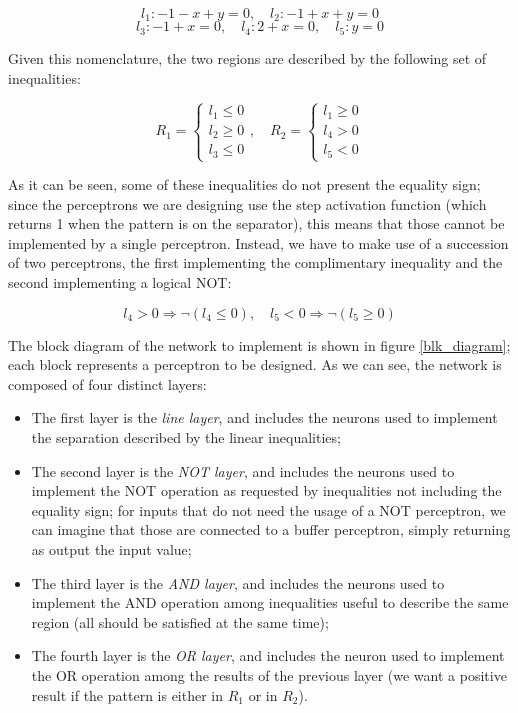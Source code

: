 \documentclass[letterpaper,headings=standardclasses]{scrartcl}
\begin{document}
$$ l_1 : - 1 - x + y = 0, \quad l_2 : -1 + x + y = 0 $$
$$ l_3 : -1 + x = 0, \quad l_4: 2 + x = 0, \quad l_5 : y = 0 $$

Given this nomenclature, the two regions are described by the following set of inequalities:

$$ R_1 = \begin{cases} l_1 \le 0 \\ l_2 \ge 0 \\ l_3 \le 0 \end{cases}, \quad R_2 = \begin{cases} l_1 \ge 0 \\ l_4 > 0 \\ l_5 < 0 \end{cases} $$

As it can be seen, some of these inequalities do not present the equality sign; since the perceptrons we are designing use the step activation function (which returns 1 when the pattern is on the separator), this means that those cannot be implemented by a single perceptron. Instead, we have to make use of a succession of two perceptrons, the first implementing the complimentary inequality and the second implementing a logical NOT:

$$ l_4 > 0 \Rightarrow \neg (l_4 \le 0), \quad l_5 < 0 \Rightarrow \neg (l_5 \ge 0) $$

The block diagram of the network to implement is shown in figure \ref{blk_diagram}; each block represents a perceptron to be designed. As we can see, the network is composed of four distinct layers:

\begin{itemize}

\item The first layer is the \emph{line layer}, and includes the neurons used to implement the separation described by the linear inequalities;

\item The second layer is the \emph{NOT layer}, and includes the neurons used to implement the NOT operation as requested by inequalities not including the equality sign; for inputs that do not need the usage of a NOT perceptron, we can imagine that those are connected to a buffer perceptron, simply returning as output the input value;

\item The third layer is the \emph{AND layer}, and includes the neurons used to implement the AND operation among inequalities useful to describe the same region (all should be satisfied at the same time);

\item The fourth layer is the \emph{OR layer}, and includes the neuron used to implement the OR operation among the results of the previous layer (we want a positive result if the pattern is either in $R_1$ or in $R_2$).

\end{itemize}
\end{document}
